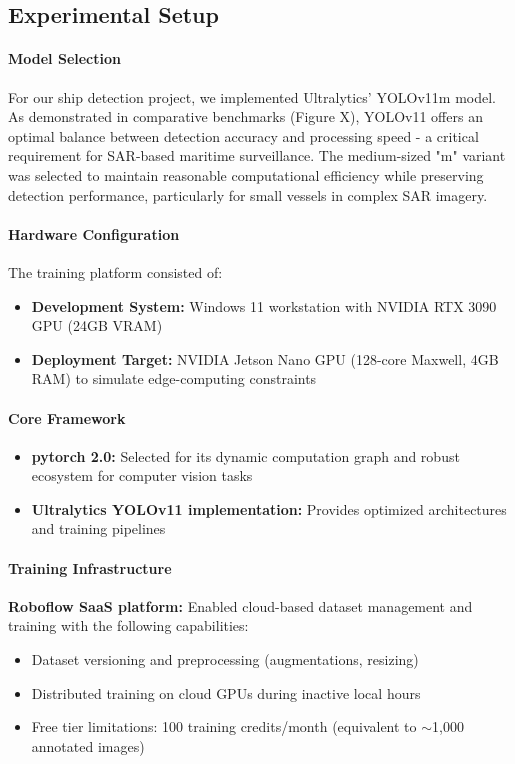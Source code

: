\documentclass{article}
\begin{document}
\subsection{Experimental Setup}
\paragraph{Model Selection}
For our ship detection project, we implemented Ultralytics' YOLOv11m model. As demonstrated in comparative benchmarks (Figure X), YOLOv11 offers an optimal balance between detection accuracy and processing speed - a critical requirement for SAR-based maritime surveillance. The medium-sized "m" variant was selected to maintain reasonable computational efficiency while preserving detection performance, particularly for small vessels in complex SAR imagery. \paragraph{Hardware Configuration}
The training platform consisted of:

\begin{itemize}
    \item \textbf{Development System:} Windows 11 workstation with NVIDIA RTX 3090 GPU (24GB VRAM)
    \item \textbf{Deployment Target:} NVIDIA Jetson Nano GPU (128-core Maxwell, 4GB RAM) to simulate edge-computing constraints
\end{itemize}


\paragraph{Core Framework}
\begin{itemize}
    \item \textbf{\acrshort{pytorch} 2.0:} Selected for its dynamic computation graph and robust ecosystem for computer vision tasks
    \item \textbf{Ultralytics YOLOv11 implementation:} Provides optimized architectures and training pipelines
\end{itemize}

\paragraph{Training Infrastructure}
\textbf{Roboflow SaaS platform:} Enabled cloud-based dataset management and training with the following capabilities:
\begin{itemize}
    \item Dataset versioning and preprocessing (augmentations, resizing)
    \item Distributed training on cloud GPUs during inactive local hours
    \item Free tier limitations: 100 training credits/month (equivalent to $\sim$1,000 annotated images)
\end{itemize}
\end{document}
